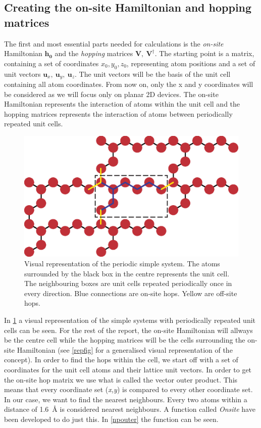 \subsection{Creating the on-site Hamiltonian and hopping matrices}
The first and most essential parts needed for calculations is the \textit{on-site} Hamiltonian \(\mathbf{h_0}\) and the \textit{hopping} matrices \(\mathbf{V},\ \mathbf{V}^{\dagger}\). The starting point is a matrix, containing a set of coordinates \(x_0,y_0,z_0\), representing atom positions and a set of unit vectors \(\mathbf{u}_x, \ \mathbf{u}_y, \ \mathbf{u}_z\). The unit vectors will be the basis of the unit cell containing all atom coordinates. From now on, only the x and y coordinates will be considered as we will focus only on planar 2D devices.
The on-site Hamiltonian represents the interaction of atoms within the unit cell and the hopping matrices represents the interaction of atoms between periodically repeated unit cells.
\begin{figure}[ht]
	\centering
	\includegraphics[width=.7\textwidth]{Figures/atomreffig.eps}
	\caption{Visual representation of the periodic simple system. The atoms surrounded by the black box in the centre represents the unit cell. The neighbouring boxes are unit cells repeated periodically once in every direction. Blue connections are on-site hops. Yellow are off-site hops.}
	\label{atomrepfig}
\end{figure}
In \cref{atomrepfig} a visual representation of the simple systems with periodically repeated unit cells can be seen. For the rest of the report, the on-site Hamiltonian will allways be the centre cell while the hopping matrices will be the cells surrounding the on-site Hamiltonian (see \cref{repfig} for a generalised visual representation of the concept).\newline
In order to find the hops within the cell, we start off with a set of coordinates for the unit cell atoms and their lattice unit vectors. In order to get the on-site hop matrix we use what is called the vector outer product. This means that every coordinate set (\textit{x,y}) is compared to every other coordinate set. In our case, we want to find the nearest neighbours. Every two atoms within a distance of \SI{1.6}{\angstrom} is considered nearest neighbours. A function called \textit{Onsite} have been developed to do just this. In \cref{npouter} the function can be seen.
